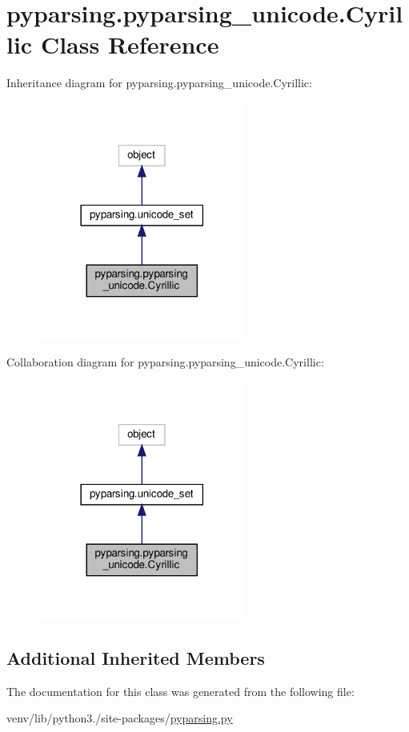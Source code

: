 \hypertarget{classpyparsing_1_1pyparsing__unicode_1_1Cyrillic}{}\section{pyparsing.\+pyparsing\+\_\+unicode.\+Cyrillic Class Reference}
\label{classpyparsing_1_1pyparsing__unicode_1_1Cyrillic}


Inheritance diagram for pyparsing.\+pyparsing\+\_\+unicode.\+Cyrillic\+:
\nopagebreak
\begin{figure}[H]
\begin{center}
\leavevmode
\includegraphics[width=194pt]{classpyparsing_1_1pyparsing__unicode_1_1Cyrillic__inherit__graph}
\end{center}
\end{figure}


Collaboration diagram for pyparsing.\+pyparsing\+\_\+unicode.\+Cyrillic\+:
\nopagebreak
\begin{figure}[H]
\begin{center}
\leavevmode
\includegraphics[width=194pt]{classpyparsing_1_1pyparsing__unicode_1_1Cyrillic__coll__graph}
\end{center}
\end{figure}
\subsection*{Additional Inherited Members}


The documentation for this class was generated from the following file\+:\begin{DoxyCompactItemize}
\item 
venv/lib/python3./site-\/packages/\hyperlink{pyparsing_8py}{pyparsing.\+py}\end{DoxyCompactItemize}
